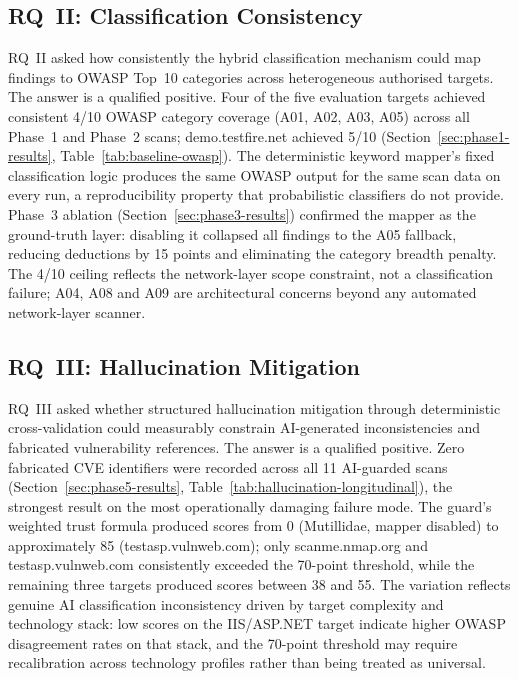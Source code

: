 \documentclass[12pt, a4paper, oneside]{report}
\begin{document}
\subsection*{RQ~II: Classification Consistency}

RQ~II asked how consistently the hybrid classification mechanism could map findings to OWASP Top~10 categories across heterogeneous authorised targets. The answer is a qualified positive. Four of the five evaluation targets achieved consistent 4/10 OWASP category coverage (A01, A02, A03, A05) across all Phase~1 and Phase~2 scans; demo.testfire.net achieved 5/10 (Section~\ref{sec:phase1-results}, Table~\ref{tab:baseline-owasp}). The deterministic keyword mapper's fixed classification logic produces the same OWASP output for the same scan data on every run, a reproducibility property that probabilistic classifiers do not provide. Phase~3 ablation (Section~\ref{sec:phase3-results}) confirmed the mapper as the ground-truth layer: disabling it collapsed all findings to the A05 fallback, reducing deductions by 15 points and eliminating the category breadth penalty. The 4/10 ceiling reflects the network-layer scope constraint, not a classification failure; A04, A08 and A09 are architectural concerns beyond any automated network-layer scanner.

\subsection*{RQ~III: Hallucination Mitigation}

RQ~III asked whether structured hallucination mitigation through deterministic cross-validation could measurably constrain AI-generated inconsistencies and fabricated vulnerability references. The answer is a qualified positive. Zero fabricated CVE identifiers were recorded across all 11 AI-guarded scans (Section~\ref{sec:phase5-results}, Table~\ref{tab:hallucination-longitudinal}), the strongest result on the most operationally damaging failure mode. The guard's weighted trust formula produced scores from 0 (Mutillidae, mapper disabled) to approximately 85 (testasp.vulnweb.com); only scanme.nmap.org and testasp.vulnweb.com consistently exceeded the 70-point threshold, while the remaining three targets produced scores between 38 and 55. The variation reflects genuine AI classification inconsistency driven by target complexity and technology stack: low scores on the IIS/ASP.NET target indicate higher OWASP disagreement rates on that stack, and the 70-point threshold may require recalibration across technology profiles rather than being treated as universal.
\end{document}
